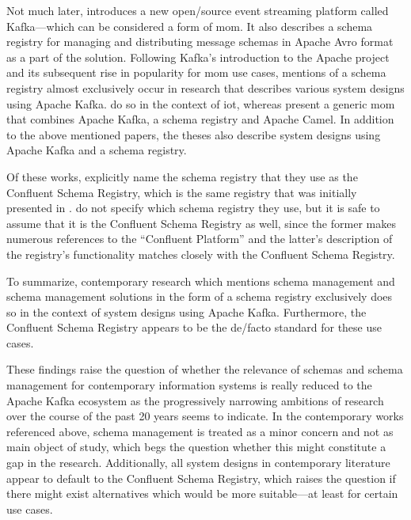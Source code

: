 Not much later, \cite{kreps_kafka_2011} introduces a new open\-/source event streaming platform called Kafka---which can be considered a form of \gls{mom}. It also describes a schema registry for managing and distributing message schemas in Apache Avro format as a part of the solution.
Following Kafka's introduction to the Apache project and its subsequent rise in popularity for \gls{mom} use cases, mentions of a schema registry almost exclusively occur in research that describes various system designs using Apache Kafka.
\cites{muller_iot_2017}{radchenko_micro-workflows_2018}{ranjan_radar-base_2019} do so in the context of \gls{iot}, whereas \cite{g_b_high_2021} present a generic \gls{mom} that combines Apache Kafka, a schema registry and Apache Camel.
In addition to the above mentioned papers, the theses \cites{dessalegn_muruts_multi-tenant_2016}{auer_distributed_2017}{korhonen_using_2019} also describe system designs using Apache Kafka and a schema registry.

Of these works, \cites{muller_iot_2017}{radchenko_micro-workflows_2018}{dessalegn_muruts_multi-tenant_2016}{auer_distributed_2017}{korhonen_using_2019} explicitly name the schema registry that they use as the Confluent Schema Registry, which is the same registry that was initially presented in \cite{kreps_kafka_2011}.
\cites{ranjan_radar-base_2019}{g_b_high_2021} do not specify which schema registry they use, but it is safe to assume that it is the Confluent Schema Registry as well, since the former makes numerous references to the \enquote{Confluent Platform} and the latter's description of the registry's functionality matches closely with the Confluent Schema Registry.

To summarize, contemporary research which mentions schema management and schema management solutions in the form of a schema registry exclusively does so in the context of system designs using Apache Kafka.
Furthermore, the Confluent Schema Registry appears to be the de\-/facto standard for these use cases.

These findings raise the question of whether the relevance of schemas and schema management for contemporary information systems is really reduced to the Apache Kafka ecosystem as the progressively narrowing ambitions of research over the course of the past 20 years seems to indicate.
In the contemporary works referenced above, schema management is treated as a minor concern and not as main object of study, which begs the question whether this might constitute a gap in the research.
Additionally, all system designs in contemporary literature appear to default to the Confluent Schema Registry, which raises the question if there might exist alternatives which would be more suitable---at least for certain use cases.
